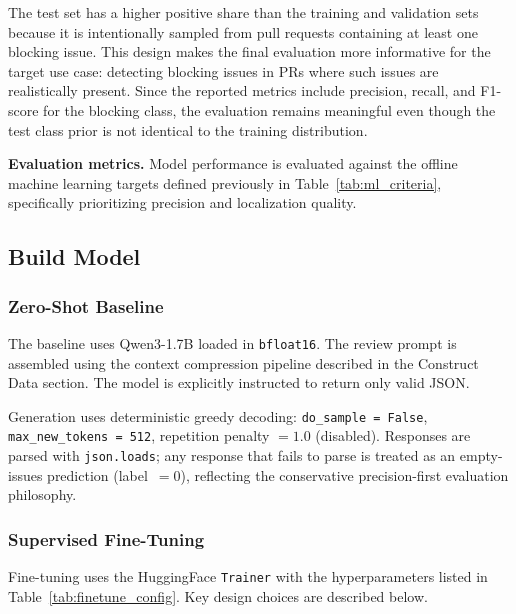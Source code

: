\documentclass[11pt]{article}
\begin{document}
The test set has a higher positive share than the training and validation sets because it is intentionally sampled from pull requests containing at least one blocking issue. This design makes the final evaluation more informative for the target use case: detecting blocking issues in PRs where such issues are realistically present. Since the reported metrics include precision, recall, and F1-score for the blocking class, the evaluation remains meaningful even though the test class prior is not identical to the training distribution.

\textbf{Evaluation metrics.}
Model performance is evaluated against the offline machine learning targets defined previously in Table~\ref{tab:ml_criteria}, specifically prioritizing precision and localization quality.

\subsection*{Build Model}

\subsubsection*{Zero-Shot Baseline}

The baseline uses Qwen3-1.7B loaded in \texttt{bfloat16}. The review prompt is assembled using the context compression pipeline described in the Construct Data section. The model is explicitly instructed to return only valid JSON.

Generation uses deterministic greedy decoding: \texttt{do\_sample = False}, \texttt{max\_new\_tokens = 512}, repetition penalty $= 1.0$ (disabled). Responses are parsed with \texttt{json.loads}; any response that fails to parse is treated as an empty-issues prediction (label~$= 0$), reflecting the conservative precision-first evaluation philosophy.

\subsubsection*{Supervised Fine-Tuning}

Fine-tuning uses the HuggingFace \texttt{Trainer} with the hyperparameters listed in Table~\ref{tab:finetune_config}. Key design choices are described below.
\end{document}
